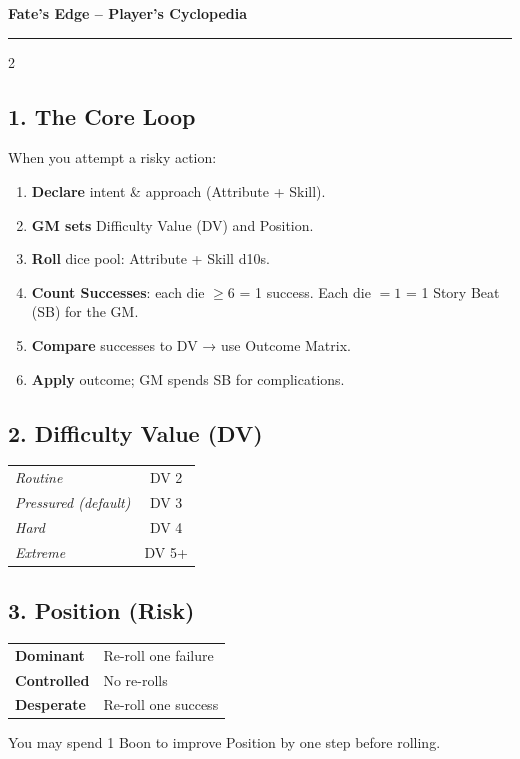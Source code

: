 \documentclass[10pt,landscape]{article}
\begin{document}
\begin{center}
{\huge \textbf{Fate's Edge -- Player's Cyclopedia}}
\end{center}
\vspace{-0.5ex}
\hrule
\vspace{1ex}
\begin{multicols}{2}

\subsection*{1. The Core Loop}
When you attempt a risky action:
\begin{enumerate}
    \item \textbf{Declare} intent \& approach (Attribute + Skill).
    \item \textbf{GM sets} Difficulty Value (DV) and Position.
    \item \textbf{Roll} dice pool: Attribute + Skill d10s.
    \item \textbf{Count Successes}: each die $\ge 6$ = 1 success. Each die $=1$ = 1 Story Beat (SB) for the GM.
    \item \textbf{Compare} successes to DV → use Outcome Matrix.
    \item \textbf{Apply} outcome; GM spends SB for complications.
\end{enumerate}

\subsection*{2. Difficulty Value (DV)}
\begin{tabularx}{\linewidth}{X c}
\textit{Routine} & DV 2 \\
\textit{Pressured (default)} & DV 3 \\
\textit{Hard} & DV 4 \\
\textit{Extreme} & DV 5+ \\
\end{tabularx}

\subsection*{3. Position (Risk)}
\begin{tabularx}{\linewidth}{X X}
\textbf{Dominant} & Re-roll one failure \\
\textbf{Controlled} & No re-rolls \\
\textbf{Desperate} & Re-roll one success \\
\end{tabularx}
\vspace{0.5ex}
You may spend 1 Boon to improve Position by one step before rolling.


\end{multicols}
\end{document}

